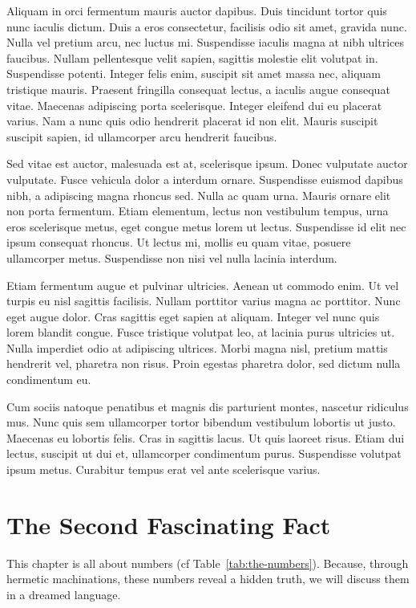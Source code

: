 \documentclass[9pt]{memoir}
\begin{document}
Aliquam in orci fermentum mauris auctor dapibus. Duis tincidunt tortor quis nunc iaculis dictum. Duis a eros consectetur, facilisis odio sit amet, gravida nunc. Nulla vel pretium arcu, nec luctus mi. Suspendisse iaculis magna at nibh ultrices faucibus. Nullam pellentesque velit sapien, sagittis molestie elit volutpat in. Suspendisse potenti. Integer felis enim, suscipit sit amet massa nec, aliquam tristique mauris. Praesent fringilla consequat lectus, a iaculis augue consequat vitae. Maecenas adipiscing porta scelerisque. Integer eleifend dui eu placerat varius. Nam a nunc quis odio hendrerit placerat id non elit. Mauris suscipit suscipit sapien, id ullamcorper arcu hendrerit faucibus.

Sed vitae est auctor, malesuada est at, scelerisque ipsum. Donec vulputate auctor vulputate. Fusce vehicula dolor a interdum ornare. Suspendisse euismod dapibus nibh, a adipiscing magna rhoncus sed. Nulla ac quam urna. Mauris ornare elit non porta fermentum. Etiam elementum, lectus non vestibulum tempus, urna eros scelerisque metus, eget congue metus lorem ut lectus. Suspendisse id elit nec ipsum consequat rhoncus. Ut lectus mi, mollis eu quam vitae, posuere ullamcorper metus. Suspendisse non nisi vel nulla lacinia interdum.

Etiam fermentum augue et pulvinar ultricies. Aenean ut commodo enim. Ut vel turpis eu nisl sagittis facilisis. Nullam porttitor varius magna ac porttitor. Nunc eget augue dolor. Cras sagittis eget sapien at aliquam. Integer vel nunc quis lorem blandit congue. Fusce tristique volutpat leo, at lacinia purus ultricies ut. Nulla imperdiet odio at adipiscing ultrices. Morbi magna nisl, pretium mattis hendrerit vel, pharetra non risus. Proin egestas pharetra dolor, sed dictum nulla condimentum eu.

Cum sociis natoque penatibus et magnis dis parturient montes, nascetur ridiculus mus. Nunc quis sem ullamcorper tortor bibendum vestibulum lobortis ut justo. Maecenas eu lobortis felis. Cras in sagittis lacus. Ut quis laoreet risus. Etiam dui lectus, suscipit ut dui et, ullamcorper condimentum purus. Suspendisse volutpat ipsum metus. Curabitur tempus erat vel ante scelerisque varius.



\chapter{The Second Fascinating Fact}
This chapter is all about numbers (cf Table~\ref{tab:the-numbers}). Because, through hermetic machinations, these numbers reveal a hidden truth, we will discuss them in a dreamed language.
\end{document}
